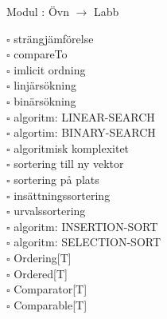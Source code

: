 
Modul : Övn  $\rightarrow$ Labb 
\begin{multicols}{3}\SlideFontTiny
$\square$ strängjämförelse \\
$\square$ compareTo \\
$\square$ imlicit ordning \\
$\square$ linjärsökning \\
$\square$ binärsökning \\
$\square$ algoritm: LINEAR-SEARCH \\
$\square$ algortim: BINARY-SEARCH \\
$\square$ algoritmisk komplexitet \\
$\square$ sortering till ny vektor \\
$\square$ sortering på plats \\
$\square$ insättningssortering \\
$\square$ urvalssortering \\
$\square$ algoritm: INSERTION-SORT \\
$\square$ algoritm: SELECTION-SORT \\
$\square$ Ordering[T] \\
$\square$ Ordered[T] \\
$\square$ Comparator[T] \\
$\square$ Comparable[T] \\     
\end{multicols}
